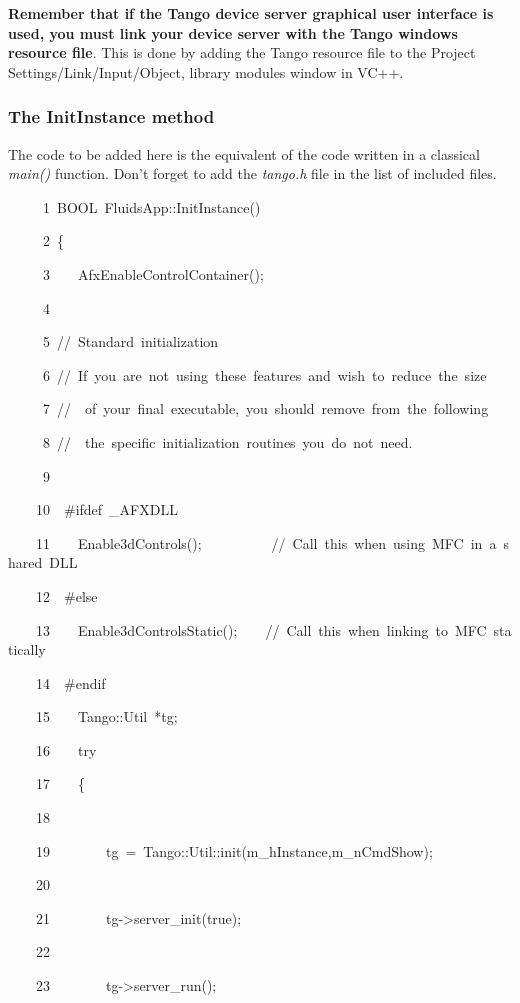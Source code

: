 \textbf{Remember that if the Tango device server graphical user interface
is used, you must link your device server with the Tango windows resource
file}. This is done by adding the Tango resource file to the Project
Settings/Link/Input/Object, library modules window in VC++.


\subsubsection{The InitInstance method}

The code to be added here is the equivalent of the code written in
a classical \emph{main()} function. Don't forget to add the \emph{tango.h}
file in the list of included files.


\begin{lyxcode}
~~~~~1~BOOL~FluidsApp::InitInstance()

~~~~~2~\{

~~~~~3~~~~AfxEnableControlContainer();

~~~~~4~~

~~~~~5~//~Standard~initialization

~~~~~6~//~If~you~are~not~using~these~features~and~wish~to~reduce~the~size

~~~~~7~//~~of~your~final~executable,~you~should~remove~from~the~following

~~~~~8~//~~the~specific~initialization~routines~you~do~not~need.

~~~~~9~~

~~~~10~~\#ifdef~\_AFXDLL

~~~~11~~~~Enable3dControls();~~~~~~~~~~//~Call~this~when~using~MFC~in~a~shared~DLL

~~~~12~~\#else

~~~~13~~~~Enable3dControlsStatic();~~~~//~Call~this~when~linking~to~MFC~statically

~~~~14~~\#endif

~~~~15~~~~Tango::Util~{*}tg;

~~~~16~~~~try

~~~~17~~~~\{

~~~~18~~~~~~~~~~

~~~~19~~~~~~~~tg~=~Tango::Util::init(m\_hInstance,m\_nCmdShow);

~~~~20~~

~~~~21~~~~~~~~tg->server\_init(true);

~~~~22~~

~~~~23~~~~~~~~tg->server\_run();


\end{lyxcode}
